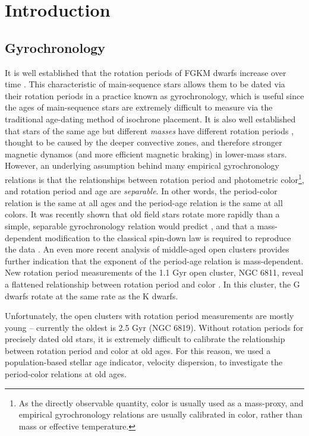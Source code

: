 \section{Introduction}

\subsection{Gyrochronology}
It is well established that the rotation periods of FGKM dwarfs increase over
time \citep{skumanich1972}.
This characteristic of main-sequence stars allows them to be dated via their
rotation periods in a practice known as gyrochronology, which is useful
since the ages of main-sequence stars are extremely difficult to measure via
the traditional age-dating method of isochrone placement.
It is also well established that stars of the same age but different {\it
masses} have different rotation periods , thought to be
caused by the deeper convective zones, and therefore stronger magnetic dynamos
(and more efficient magnetic braking) in lower-mass stars.
However, an underlying assumption behind many empirical gyrochronology
relations \citep[\eg][]{barnes2003, barnes2007, mamajek2008, meibom2011,
angus2015, angus2019} is that the relationships between rotation period and
photometric color\footnote{As the directly observable quantity, color is
usually used as a mass-proxy, and empirical gyrochronology relations are
usually calibrated in color, rather than mass or effective temperature.
}, and rotation period and age are {\it separable}.
In other words, the period-color relation is the same at all ages and the
period-age relation is the same at all colors.
It was recently shown that old field stars rotate more rapidly than a simple,
separable gyrochronology relation would predict \citep{angus2015,
vansaders2016, vansaders2018, metcalfe2019}, and that a mass-dependent
modification to the classical \citet{skumanich1972} spin-down law is required
to reproduce the data \citep{vansaders2016, vansaders2018}.
An even more recent analysis of middle-aged open clusters provides further
indication that the exponent of the period-age relation is mass-dependent.
New rotation period measurements of the 1.1 Gyr open cluster, NGC 6811,
reveal a flattened relationship between rotation period and color
\citep{curtis2019}.
In this cluster, the G dwarfs rotate at the same rate as the K dwarfs.

Unfortunately, the open clusters with rotation period measurements are mostly
young -- currently the oldest is 2.5 Gyr (NGC 6819).
Without rotation periods for precisely dated old stars, it is extremely
difficult to calibrate the relationship between rotation period and color at
old ages.
For this reason, we used a population-based stellar age indicator, velocity
dispersion, to investigate the period-color relations at old ages.


